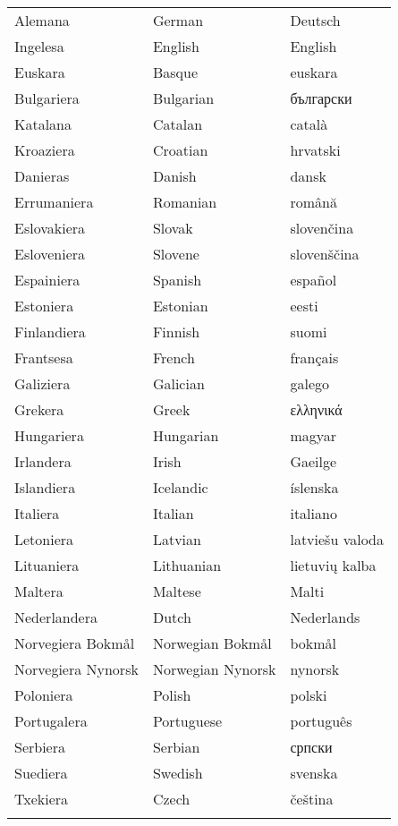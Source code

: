 \documentclass[10pt]{article}
\begin{document}
\centering
\begin{tabulary}{170mm}{LLL} \toprule
  Alemana & German & Deutsch\\
  Ingelesa & English & English\\
  Euskara & Basque & euskara\\
  Bulgariera & Bulgarian & български \\
  Katalana & Catalan & català\\
  Kroaziera & Croatian & hrvatski\\
  Danieras & Danish & dansk\\
  Errumaniera & Romanian & română\\  
  Eslovakiera & Slovak & slovenčina\\
  Esloveniera & Slovene & slovenščina\\
  Espainiera & Spanish & español\\
  Estoniera & Estonian & eesti\\
  Finlandiera & Finnish & suomi\\
  Frantsesa & French & français\\
  Galiziera & Galician & galego\\
  Grekera & Greek & ελληνικά\\
  Hungariera & Hungarian & magyar\\ 
  Irlandera & Irish & Gaeilge\\
  Islandiera & Icelandic & íslenska\\
  Italiera & Italian & italiano\\
  Letoniera & Latvian & latviešu valoda\\
  Lituaniera & Lithuanian & lietuvių kalba\\
  Maltera & Maltese & Malti\\
  Nederlandera & Dutch & Nederlands\\ 
  Norvegiera Bokmål & Norwegian Bokmål & bokmål\\
  Norvegiera Nynorsk & Norwegian Nynorsk & nynorsk\\
  Poloniera & Polish & polski\\
  Portugalera & Portuguese & português\\
  Serbiera & Serbian & српски\\
  Suediera & Swedish & svenska\\
  Txekiera & Czech & čeština\\  \addlinespace \bottomrule
\end{tabulary}
\end{document}
